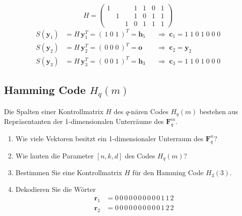 \begin{loesung}
\[
H =
\begin{pmatrix}
1 & & & 1 & 1 & 0 & 1\\
& 1 & & 1 & 0 & 1 & 1\\
& & 1 & 0 & 1 & 1 & 1
\end{pmatrix}
\]
\begin{align*}
S(\mathbf{y}_1) &= H\,\mathbf{y}_1^T = (\,1\;0\;1\,)^T = \mathbf{h}_5 && \Rightarrow\; \mathbf{c}_1 = 1\;1\;0\;1\;0\;0\;0\\
S(\mathbf{y}_2) &= H\,\mathbf{y}_2^T = (\,0\;0\;0\,)^T = \mathbf{o} && \Rightarrow\; \mathbf{c}_2 = \mathbf{y}_2\\
S(\mathbf{y}_3) &= H\,\mathbf{y}_3^T = (\,0\;0\;1\,)^T = \mathbf{h}_3 && \Rightarrow\; \mathbf{c}_3 = 1\;1\;0\;1\;0\;0\;0
\end{align*}
\end{loesung}

\subsection{Hamming Code $H_q(m)$}

\begin{aufgabe}[5\_5]
Die Spalten einer Kontrollmatrix $H$ des $q$-nären Codes $H_q(m)$ bestehen aus Repräsentanten der 1-dimensionalen Unterräume des $\mathbf{F}_q^m$.
\begin{enumerate}[label=\alph*)]
\item Wie viele Vektoren besitzt ein 1-dimensionaler Unterraum des $\mathbf{F}_q^n$?
\item Wie lauten die Parameter $[n, k, d]$ des Codes $H_q(m)$?
\item Bestimmen Sie eine Kontrollmatrix $H$ für den Hamming Code $H_3(3)$.
\item Dekodieren Sie die Wörter
\begin{align*}
\mathbf{r}_1 &= 0\,0\,0\,0\,0\,0\,0\,0\,0\,0\,1\,1\,2\\
\mathbf{r}_2 &= 0\,0\,0\,0\,0\,0\,0\,0\,0\,0\,1\,2\,2
\end{align*}
\end{enumerate}
\end{aufgabe}

